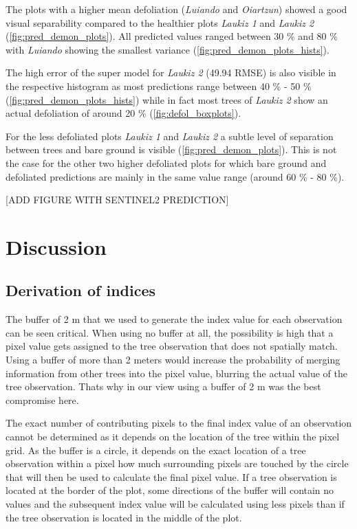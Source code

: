 \documentclass[review]{elsarticle}
\begin{document}
\noindent The plots with a higher mean defoliation (\textit{Luiando} and \textit{Oiartzun}) showed a good visual separability compared to the healthier plots \textit{Laukiz 1} and \textit{Laukiz 2} (\autoref{fig:pred_demon_plots}).
All predicted values ranged between 30 \% and 80 \% with \textit{Luiando} showing the smallest variance (\autoref{fig:pred_demon_plots_hists}).

The high error of the super model for \textit{Laukiz 2} (49.94 RMSE) is also visible in the respective histogram as most predictions range between 40 \% - 50 \% (\autoref{fig:pred_demon_plots_hists}) while in fact most trees of \textit{Laukiz 2} show an actual defoliation of around 20 \% (\autoref{fig:defol_boxplots}).

For the less defoliated plots \textit{Laukiz 1} and \textit{Laukiz 2} a subtle level of separation between trees and bare ground is visible (\autoref{fig:pred_demon_plots}).
This is not the case for the other two higher defoliated plots for which bare ground and defoliated predictions are mainly in the same value range (around 60 \% - 80 \%).

	[ADD FIGURE WITH SENTINEL2 PREDICTION]

\section{Discussion}

\subsection{Derivation of indices}

\noindent The buffer of 2 m that we used to generate the index value for each observation can be seen critical.
When using no buffer at all, the possibility is high that a pixel value gets assigned to the tree observation that does not spatially match.
Using a buffer of more than 2 meters would increase the probability of merging information from other trees into the pixel value, blurring the actual value of the tree observation.
Thats why in our view using a buffer of 2 m was the best compromise here.

The exact number of contributing pixels to the final index value of an observation cannot be determined as it depends on the location of the tree within the pixel grid.
As the buffer is a circle, it depends on the exact location of a tree observation within a pixel how much surrounding pixels are touched by the circle that will then be used to calculate the final pixel value.
If a tree observation is located at the border of the plot, some directions of the buffer will contain no values and the subsequent index value will be calculated using less pixels than if the tree observation is located in the middle of the plot.
\end{document}

